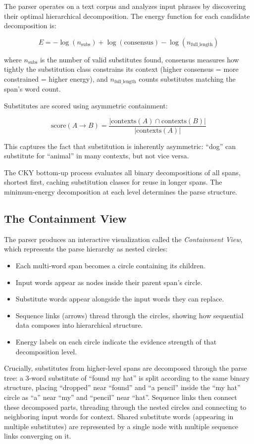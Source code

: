 \documentclass[11pt,a4paper]{article}
\begin{document}
The parser operates on a text corpus and analyzes input phrases by discovering their optimal hierarchical decomposition. The energy function for each candidate decomposition is:

\[
E = -\log(n_{\text{subs}}) + \log(\text{consensus}) - \log(n_{\text{full\_length}})
\]

where $n_{\text{subs}}$ is the number of valid substitutes found, consensus measures how tightly the substitution class constrains its context (higher consensus = more constrained = higher energy), and $n_{\text{full\_length}}$ counts substitutes matching the span's word count.

Substitutes are scored using asymmetric containment:

\[
\text{score}(A \to B) = \frac{|\text{contexts}(A) \cap \text{contexts}(B)|}{|\text{contexts}(A)|}
\]

This captures the fact that substitution is inherently asymmetric: ``dog'' can substitute for ``animal'' in many contexts, but not vice versa.

The CKY bottom-up process evaluates all binary decompositions of all spans, shortest first, caching substitution classes for reuse in longer spans. The minimum-energy decomposition at each level determines the parse structure.

\subsection{The Containment View}

The parser produces an interactive visualization called the \textit{Containment View}, which represents the parse hierarchy as nested circles:

\begin{itemize}
    \item Each multi-word span becomes a circle containing its children.
    \item Input words appear as nodes inside their parent span's circle.
    \item Substitute words appear alongside the input words they can replace.
    \item Sequence links (arrows) thread through the circles, showing how sequential data composes into hierarchical structure.
    \item Energy labels on each circle indicate the evidence strength of that decomposition level.
\end{itemize}

Crucially, substitutes from higher-level spans are decomposed through the parse tree: a 3-word substitute of ``found my hat'' is split according to the same binary structure, placing ``dropped'' near ``found'' and ``a pencil'' inside the ``my hat'' circle as ``a'' near ``my'' and ``pencil'' near ``hat''. Sequence links then connect these decomposed parts, threading through the nested circles and connecting to neighboring input words for context. Shared substitute words (appearing in multiple substitutes) are represented by a single node with multiple sequence links converging on it.
\end{document}
